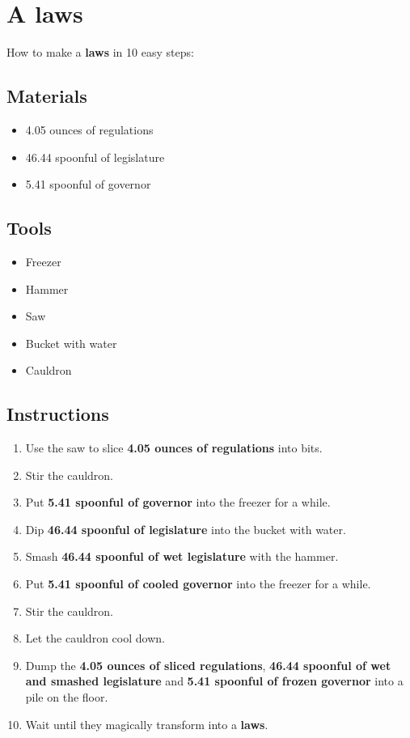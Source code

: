\documentclass{article}
\begin{document}
\section{A laws}How to make a \textbf{laws} in 10 easy steps:

\subsection{Materials}\begin{itemize}
\item 
4.05 ounces of regulations
\item 
46.44 spoonful of legislature
\item 
5.41 spoonful of governor
\end{itemize}
\subsection{Tools}\begin{itemize}
\item 
Freezer
\item 
Hammer
\item 
Saw
\item 
Bucket with water
\item 
Cauldron
\end{itemize}
\subsection{Instructions}\begin{enumerate}
\item 
Use the saw to slice \textbf{4.05 ounces of regulations} into bits.
\item 
Stir the cauldron.
\item 
Put \textbf{5.41 spoonful of governor} into the freezer for a while.
\item 
Dip \textbf{46.44 spoonful of legislature} into the bucket with water.
\item 
Smash \textbf{46.44 spoonful of wet legislature} with the hammer.
\item 
Put \textbf{5.41 spoonful of cooled governor} into the freezer for a while.
\item 
Stir the cauldron.
\item 
Let the cauldron cool down.
\item 
Dump the \textbf{4.05 ounces of sliced regulations}, \textbf{46.44 spoonful of wet and smashed legislature} and \textbf{5.41 spoonful of frozen governor} into a pile on the floor.
\item 
Wait until they magically transform into a \textbf{laws}.
\end{enumerate}
\newpage
\end{document}
